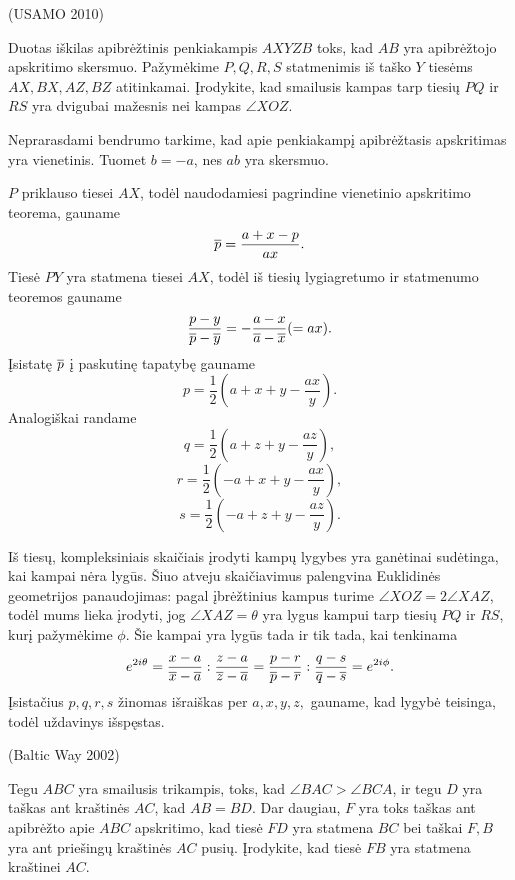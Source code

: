 \documentclass[11pt,a4paper,twoside]{book}
\begin{document}
\begin{pavnr}
(USAMO 2010) 

Duotas iškilas apibrėžtinis penkiakampis $AXYZB$ toks, kad $AB$ yra apibrėžtojo apskritimo skersmuo. Pažymėkime $P, Q, R, S$ statmenimis iš taško $Y$ tiesėms  $AX, BX, AZ, BZ$ atitinkamai. Įrodykite, kad smailusis kampas tarp tiesių $PQ$ ir $RS$ yra dvigubai mažesnis nei kampas $\angle XOZ$.
\end{pavnr}
\begin{sprendimas}
  Neprarasdami bendrumo tarkime, kad apie penkiakampį apibrėžtasis apskritimas yra vienetinis. Tuomet $b = -a$, nes $ab$ yra skersmuo. 

$P$ priklauso tiesei $AX$, todėl naudodamiesi pagrindine vienetinio apskritimo teorema, gauname $$\overline{p}=\frac{a+x-p}{ax}.$$ Tiesė $PY$ yra statmena tiesei $AX$, todėl iš tiesių lygiagretumo ir statmenumo teoremos gauname $$\frac{p-y}{\overline{p}-\overline{y}}=-\frac{a-x}{\overline{a}-\overline{x}} (=ax).$$ 
Įsistatę $\overline{p}$ į paskutinę tapatybę gauname 
$$p = \frac {1}{2}( a+x+y- \frac {ax}{y}).$$
Analogiškai randame
$$q = \frac {1}{2}( a+z+y- \frac {az}{y}),$$ 
$$r = \frac {1}{2}( -a+x+y- \frac {ax}{y}),$$
$$s = \frac {1}{2}( -a+z+y- \frac {az}{y}).$$

Iš tiesų, kompleksiniais skaičiais įrodyti kampų lygybes yra ganėtinai sudėtinga, kai kampai nėra lygūs. Šiuo atveju skaičiavimus palengvina Euklidinės geometrijos panaudojimas: pagal įbrėžtinius kampus turime $\angle XOZ = 2\angle XAZ$, todėl mums lieka įrodyti, jog  $\angle XAZ=\theta$ yra lygus kampui tarp tiesių $PQ$ ir $RS$, kurį pažymėkime $\phi$. Šie kampai yra lygūs tada ir tik tada, kai tenkinama 
$$e^{2i\theta}=\frac {x-a} {\overline x - \overline a} : \frac{z-a}{\overline z - \overline a} = \frac{p-r}{\overline p - \overline r} : \frac{q-s}{\overline q - \overline s}=e^{2i\phi}.$$
Įsistačius $p, q, r, s$ žinomas išraiškas per $a, x, y, z,$ gauname, kad lygybė teisinga, todėl uždavinys išspęstas.
\end{sprendimas}
     



\begin{pavnr}
(Baltic Way 2002) 

Tegu $ABC$ yra smailusis trikampis, toks, kad $ \angle BAC > \angle BCA$, ir tegu $D$ yra taškas ant kraštinės $AC$, kad $AB = BD$. Dar daugiau, $F$ yra toks taškas ant apibrėžto apie $ABC$ apskritimo, kad tiesė $FD$ yra statmena $BC$ bei taškai $F, B$ yra ant priešingų kraštinės $AC$ pusių. Įrodykite, kad tiesė $FB$ yra statmena kraštinei $AC$.
\end{pavnr}
\end{document}
